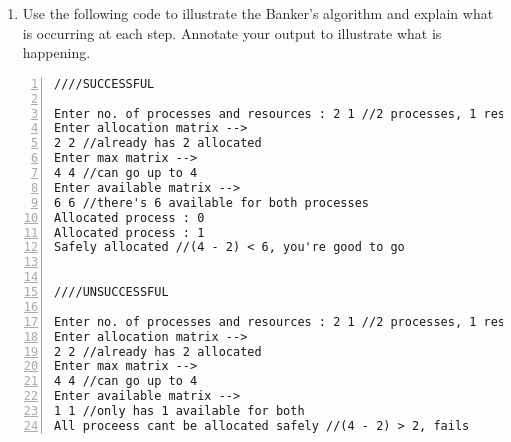 \documentclass[11pt]{article}
\begin{document}
\begin{enumerate}

\item Use the following code to illustrate the Banker’s algorithm and explain what is occurring at each step. Annotate your output to illustrate what is happening.

\end{enumerate}

\begin{center}


\newpage

\begin{lstlisting}[basicstyle=\footnotesize \ttfamily,
       numbers=left,
       numbersep=5pt,
       numberstyle=\tiny,
       title=Output]
////SUCCESSFUL

Enter no. of processes and resources : 2 1 //2 processes, 1 resource
Enter allocation matrix -->
2 2 //already has 2 allocated
Enter max matrix -->
4 4 //can go up to 4
Enter available matrix -->
6 6 //there's 6 available for both processes
Allocated process : 0
Allocated process : 1
Safely allocated //(4 - 2) < 6, you're good to go


////UNSUCCESSFUL

Enter no. of processes and resources : 2 1 //2 processes, 1 resource
Enter allocation matrix -->
2 2 //already has 2 allocated
Enter max matrix -->
4 4 //can go up to 4
Enter available matrix -->
1 1 //only has 1 available for both
All proceess cant be allocated safely //(4 - 2) > 2, fails

\end{lstlisting}

\end{center}

\newpage
\end{document}
